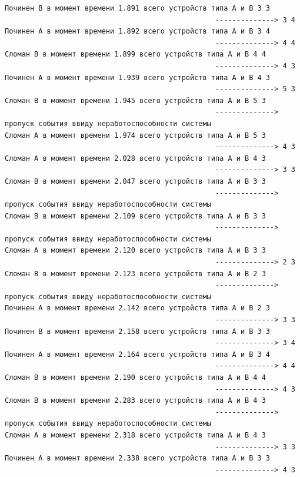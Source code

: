 \begin{verbatim}
Починен B в момент времени 1.891 всего устройств типа А и В 3 3
                                                  --------------> 3 4
Починен A в момент времени 1.892 всего устройств типа А и В 3 4
                                                  --------------> 4 4
Сломан B в момент времени 1.899 всего устройств типа А и В 4 4
                                                  --------------> 4 3
Починен A в момент времени 1.939 всего устройств типа А и В 4 3
                                                  --------------> 5 3
Сломан B в момент времени 1.945 всего устройств типа А и В 5 3
                                                  --------------> пропуск события ввиду неработоспособности системы
Сломан A в момент времени 1.974 всего устройств типа А и В 5 3
                                                  --------------> 4 3
Сломан A в момент времени 2.028 всего устройств типа А и В 4 3
                                                  --------------> 3 3
Сломан B в момент времени 2.047 всего устройств типа А и В 3 3
                                                  --------------> пропуск события ввиду неработоспособности системы
Сломан B в момент времени 2.109 всего устройств типа А и В 3 3
                                                  --------------> пропуск события ввиду неработоспособности системы
Сломан A в момент времени 2.120 всего устройств типа А и В 3 3
                                                  --------------> 2 3
Сломан B в момент времени 2.123 всего устройств типа А и В 2 3
                                                  --------------> пропуск события ввиду неработоспособности системы
Починен A в момент времени 2.142 всего устройств типа А и В 2 3
                                                  --------------> 3 3
Починен B в момент времени 2.158 всего устройств типа А и В 3 3
                                                  --------------> 3 4
Починен A в момент времени 2.164 всего устройств типа А и В 3 4
                                                  --------------> 4 4
Сломан B в момент времени 2.190 всего устройств типа А и В 4 4
                                                  --------------> 4 3
Сломан B в момент времени 2.283 всего устройств типа А и В 4 3
                                                  --------------> пропуск события ввиду неработоспособности системы
Сломан A в момент времени 2.318 всего устройств типа А и В 4 3
                                                  --------------> 3 3
Починен A в момент времени 2.338 всего устройств типа А и В 3 3
                                                  --------------> 4 3

\end{verbatim}
